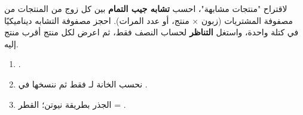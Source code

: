 \begin{statement}
لاقتراح "منتجات مشابهة"، احسب \textbf{تشابه جيب التمام} بين كل زوج من المنتجات من مصفوفة المشتريات (زبون × منتج،  أو عدد المرات). احجز مصفوفة التشابه  ديناميكيًا في كتلة واحدة، واستغل \textbf{التناظر} لحساب النصف فقط، ثم اعرض لكل منتج أقرب منتج إليه.
\end{statement}
\begin{stepsbox}\begin{enumerate}
\item \par{\centering\small{}\par}.
\item نحسب الخانة \code{[a][b]} لـ  فقط ثم ننسخها في \code{[b][a]}.
\item الجذر بطريقة نيوتن؛ القطر = .
\end{enumerate}\end{stepsbox}
